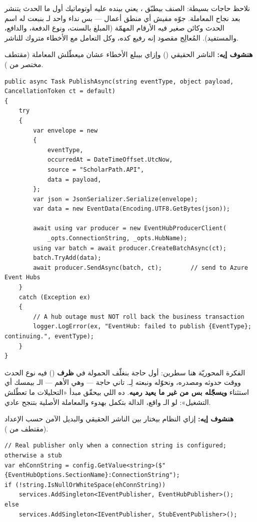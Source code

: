 نلاحظ حاجات بسيطة: الصنف بيطبّق ،
يعني  بينده عليه أوتوماتيك أول ما الحدث يتنشر بعد نجاح المعاملة. جوّه
 مفيش أي منطق أعمال — بس نداء واحد لـ
بنبعت له اسم الحدث  وكائن صغير فيه الأرقام المهمّة
(المبلغ بالسنت، ونوع الدفعة، والدافع، والمستفيد). المُعالِج مقصود إنه رفيع كده،
وكل التعامل مع الأخطاء متروك للناشر.

\textbf{هنشوف إيه:} الناشر الحقيقي () وإزاي بيبلع الأخطاء
عشان ميعطّلش المعاملة (مقتطف مختصر من ).

\begin{english}
\begin{lstlisting}[language={[Sharp]C}]
public async Task PublishAsync(string eventType, object payload, CancellationToken ct = default)
{
    try
    {
        var envelope = new
        {
            eventType,
            occurredAt = DateTimeOffset.UtcNow,
            source = "ScholarPath.API",
            data = payload,
        };
        var json = JsonSerializer.Serialize(envelope);
        var data = new EventData(Encoding.UTF8.GetBytes(json));

        await using var producer = new EventHubProducerClient(
            _opts.ConnectionString, _opts.HubName);
        using var batch = await producer.CreateBatchAsync(ct);
        batch.TryAdd(data);
        await producer.SendAsync(batch, ct);        // send to Azure Event Hubs
    }
    catch (Exception ex)
    {
        // A hub outage must NOT roll back the business transaction
        logger.LogError(ex, "EventHub: failed to publish {EventType}; continuing.", eventType);
    }
}
\end{lstlisting}
\end{english}

الفكرة المحوريّة هنا سطرين: أول حاجة بنغلّف الحمولة في \textbf{ظرف} ()
فيه نوع الحدث ووقت حدوثه ومصدره، ونحوّله  ونبعته لِـ.
تاني حاجة — وهي الأهم — الـ بيمسك أي استثناء \textbf{ويسجّله بس من
غير ما يعيد رميه}. ده اللي بيحقّق مبدأ «التحليلات ما تعطّلش التشغيل»: لو الـ
واقع، الدالة بتكمل بهدوء والمعاملة الأصلية بتنجح عادي.

\textbf{هنشوف إيه:} إزاي النظام بيختار بين الناشر الحقيقي والبديل الآمن حسب
الإعداد (مقتطف من ).

\begin{english}
\begin{lstlisting}[language={[Sharp]C}]
// Real publisher only when a connection string is configured; otherwise a stub
var ehConnString = config.GetValue<string>($"{EventHubOptions.SectionName}:ConnectionString");
if (!string.IsNullOrWhiteSpace(ehConnString))
    services.AddSingleton<IEventPublisher, EventHubPublisher>();
else
    services.AddSingleton<IEventPublisher, StubEventPublisher>();
\end{lstlisting}
\end{english}

